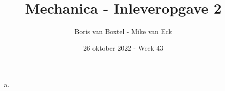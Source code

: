 \documentclass[12pt, dutch, a4paper]{article}
\begin{document}
\title{Mechanica - Inleveropgave 2}
\author{Boris van Boxtel - Mike van Eck}
\date{26 oktober 2022 - Week 43}

\maketitle
{}

\begin{enumerate}[(a).]
    \item
\end{enumerate}
\end{document}
